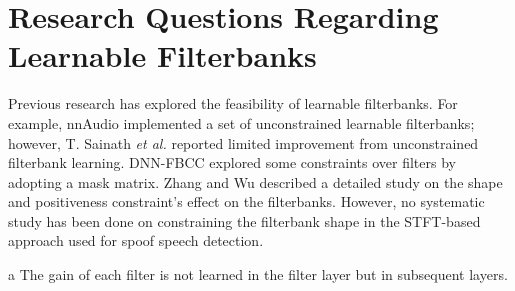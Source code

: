 \documentclass[conference]{IEEEtran}
\begin{document}
\section{Research Questions Regarding Learnable Filterbanks}
\label{question.section}
Previous research has explored the feasibility of learnable filterbanks. For example, nnAudio\cite{Cheuk2020nnAudioAO} implemented a set of unconstrained learnable filterbanks; however, T. Sainath \textit{et al.}\cite{Sainath2013LearningFB} reported limited improvement from unconstrained filterbank learning. DNN-FBCC\cite{Yu2017DNNFB} explored some constraints over filters by adopting a mask matrix. Zhang and Wu\cite{Zhang2019DiscriminativeFF} described a detailed study on the shape and positiveness constraint's effect on the filterbanks. However, no systematic study has been done on constraining the filterbank shape in the STFT-based approach used for spoof speech detection. 

\begin{table}[htbp]
\caption{\label{table:frontend-filter}Filter Comparison of Learnable Front-end}
\centering
  \begin{threeparttable}
\begin{tablenotes}
    \item[a] The gain of each filter is not learned in the filter layer but in subsequent layers.  
\end{tablenotes}
  \end{threeparttable}
\end{table}
\end{document}

